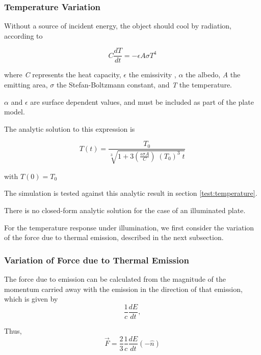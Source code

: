     \subsubsection{Temperature Variation}
      Without a source of incident energy, the object should cool by
      radiation, according to

      \begin{equation}
        C\frac{\mathit{dT}}{\mathit{dt}}=-\epsilon A\sigma T^{4}
      \end{equation}

      where \textit{C} represents the heat capacity,
      $\epsilon $ the emissivity ,  $\alpha $ the albedo,
      \textit{ A} the emitting area,
      $\sigma $ the Stefan{}-Boltzmann constant, and
      \textit{T} the temperature.

      $\alpha$ and $\epsilon$ are surface dependent values, and must
      be included as part of the plate model.

      The analytic solution to this expression is

      \begin{equation}
        T(t)=\frac{T_{0}}{\sqrt[{3}]{1+3\left(\frac{\epsilon \sigma
        A}{C}\right)\;(T_{0})^{3}\;t}}
      \end{equation}

      with  $T(0)=T_{0}$

      The simulation is tested against this analytic result in section
      \vref{test:temperature}.

      There is no closed{}-form analytic solution for the case of an
      illuminated plate.

      For the temperature response under illumination, we first consider
      the variation of the force due to thermal emission, described  in
      the next subsection.

    \subsubsection{Variation of Force due to Thermal Emission}

      The force due to emission can be calculated from the magnitude of the
      momentum carried away with the
      emission in the direction of that emission, which is given by
      \begin{equation*}
      \frac{1}{c}\frac{\mathit{dE}}{\mathit{dt}},
      \end{equation*}

      Thus,
      \begin{equation}
        \vec{F}=\frac{2}{3}\frac{1}{c}\frac{\mathit{dE}}{\mathit{dt}}(-\hat{n})
      \end{equation}


